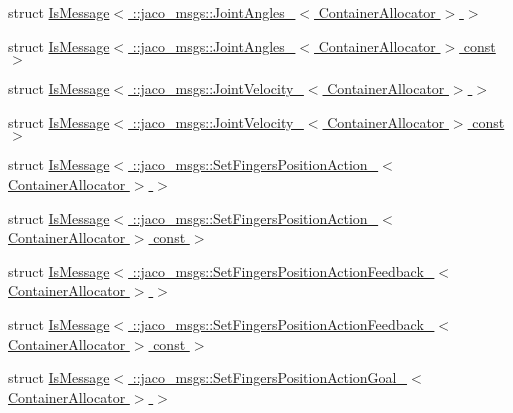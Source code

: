 \begin{DoxyCompactItemize}
\item 
struct \hyperlink{structros_1_1message__traits_1_1IsMessage_3_01_1_1jaco__msgs_1_1JointAngles___3_01ContainerAllocator_01_4_01_4}{Is\+Message$<$ \+::jaco\+\_\+msgs\+::\+Joint\+Angles\+\_\+$<$ Container\+Allocator $>$ $>$}
\item 
struct \hyperlink{structros_1_1message__traits_1_1IsMessage_3_01_1_1jaco__msgs_1_1JointAngles___3_01ContainerAllocator_01_4_01const_01_01_4}{Is\+Message$<$ \+::jaco\+\_\+msgs\+::\+Joint\+Angles\+\_\+$<$ Container\+Allocator $>$ const  $>$}
\item 
struct \hyperlink{structros_1_1message__traits_1_1IsMessage_3_01_1_1jaco__msgs_1_1JointVelocity___3_01ContainerAllocator_01_4_01_4}{Is\+Message$<$ \+::jaco\+\_\+msgs\+::\+Joint\+Velocity\+\_\+$<$ Container\+Allocator $>$ $>$}
\item 
struct \hyperlink{structros_1_1message__traits_1_1IsMessage_3_01_1_1jaco__msgs_1_1JointVelocity___3_01ContainerAllocator_01_4_01const_01_01_4}{Is\+Message$<$ \+::jaco\+\_\+msgs\+::\+Joint\+Velocity\+\_\+$<$ Container\+Allocator $>$ const  $>$}
\item 
struct \hyperlink{structros_1_1message__traits_1_1IsMessage_3_01_1_1jaco__msgs_1_1SetFingersPositionAction___3_01ContainerAllocator_01_4_01_4}{Is\+Message$<$ \+::jaco\+\_\+msgs\+::\+Set\+Fingers\+Position\+Action\+\_\+$<$ Container\+Allocator $>$ $>$}
\item 
struct \hyperlink{structros_1_1message__traits_1_1IsMessage_3_01_1_1jaco__msgs_1_1SetFingersPositionAction___3_01Caf1fc3d4a1a1bf21603541e53ed9a91b}{Is\+Message$<$ \+::jaco\+\_\+msgs\+::\+Set\+Fingers\+Position\+Action\+\_\+$<$ Container\+Allocator $>$ const  $>$}
\item 
struct \hyperlink{structros_1_1message__traits_1_1IsMessage_3_01_1_1jaco__msgs_1_1SetFingersPositionActionFeedback7883aff851146da8b28ed215ccf9ded2}{Is\+Message$<$ \+::jaco\+\_\+msgs\+::\+Set\+Fingers\+Position\+Action\+Feedback\+\_\+$<$ Container\+Allocator $>$ $>$}
\item 
struct \hyperlink{structros_1_1message__traits_1_1IsMessage_3_01_1_1jaco__msgs_1_1SetFingersPositionActionFeedbackb6963dc43ef7b28386de0d37976edd0c}{Is\+Message$<$ \+::jaco\+\_\+msgs\+::\+Set\+Fingers\+Position\+Action\+Feedback\+\_\+$<$ Container\+Allocator $>$ const  $>$}
\item 
struct \hyperlink{structros_1_1message__traits_1_1IsMessage_3_01_1_1jaco__msgs_1_1SetFingersPositionActionGoal___3_01ContainerAllocator_01_4_01_4}{Is\+Message$<$ \+::jaco\+\_\+msgs\+::\+Set\+Fingers\+Position\+Action\+Goal\+\_\+$<$ Container\+Allocator $>$ $>$}

\end{DoxyCompactItemize}

